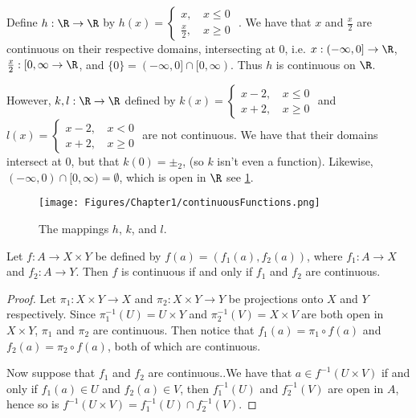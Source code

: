 \begin{example}
        Define $h:\R \rightarrow \R$ by $h(x)=
            \begin{cases}
                x \text{, } & x \leq 0 \\
                \frac{x}{2} \text{, } & x \geq 0 
            \end{cases}$
        . We have that $x$ and  $\frac{x}{2}$ are continuous on their respective domains,
        intersecting at $0$, i.e.  $x:(-\infty,0] \rightarrow \R$, $ \frac{x}{2}:[0,\infty
        \rightarrow \R$, and $\{0\}=(-\infty, 0] \cap [0, \infty)$. Thus $h$ is continuous on $\R$.


        However, $k,l:\R \rightarrow \R$ defined by $k(x)=
            \begin{cases}
                x-2 \text{, } & x \leq 0 \\
                x+2 \text{, } & x \geq 0 
            \end{cases}$
            and $l(x)=
            \begin{cases}
                x-2 \text{, } & x < 0 \\
                x+2 \text{, } & x \geq 0 
            \end{cases}$
            are not continuous. We have that their domains intersect at $0$, but that  $k(0)=\pm_2$,
            (so $k$ isn't even a function). Likewise, $(-\infty,0) \cap [0,\infty)=\emptyset$, which
            is open in $\R$ see \ref{fig_1.9}.

            \begin{figure}
                \centering
                \texttt{[image: Figures/Chapter1/continuousFunctions.png]}
                \caption{The mappings $h$, $k$, and  $l$.}
                \label{fig_1.9}
            \end{figure}
\end{example} 

\begin{theorem}\label{1.7.5}
    Let $f:A \rightarrow X \times Y$ be defined by  $f(a)=(f_1(a),f_2(a))$, where $ f_1:A
    \rightarrow X$ and $ f_2: A \rightarrow Y$. Then $f$ is continuous if and only if  $ f_1$ and $
    f_2$ are continuous.
\end{theorem}
\begin{proof}
    Let $\pi_1:X \times Y \rightarrow X$ and $\pi_2:X \times Y \rightarrow Y$ be projections onto
    $X$ and  $Y$ respectively. Since  $\pi_1^{-1}(U)=U \times Y$ and $\pi_2^{-1}(V)=X \times V$ are
    both open in  $X \times Y$,  $\pi_1$ and $\pi_2$ are continuous. Then notice that $ f_1(a)=\pi_1
    \circ f(a)$ and $ f_2(a)=\pi_2 \circ f(a)$, both of which are continuous.

    Now suppose that $ f_1$ and $ f_2$ are continuous..We have that $a \in f^{-1}(U \times V)$ if
    and only if $f_1(a) \in U$ and $ f_2(a) \in V$, then $ f_1^{-1}(U)$ and $f_2^{-1}(V)$ are open
    in $A$, hence so is $f^{-1}(U \times V)=f_1^{-1}(U) \cap f_2^{-1}(V)$.
\end{proof}


